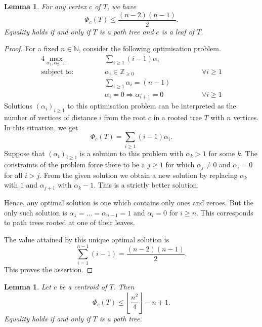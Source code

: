 \documentclass[reqno,dvipsnames]{amsart}
\theoremstyle{plain}
\newtheorem{lemma}[theorem]{Lemma}
\numberwithin{equation}{section}
\theoremstyle{definition}
\begin{document}
\begin{lemma}\label{linearphibound}
	For any vertex $c$ of $T$, we have
	\[
	\Phi_c(T) \leq \frac{(n-2)(n-1)}{2}.
	\]
	Equality holds if and only if $T$ is a path tree and $c$ is a leaf of $T$.
\end{lemma}

\begin{proof}
	For a fixed $n\in \mathbb{N}$, consider the following optimisation problem.
	\begin{alignat*}{4}
		\max_{\alpha_1,\alpha_2,\dots}	&\qquad	&&\sum_{i\geq 1} (i-1) \alpha_i  &\qquad&&\\
		\text{subject to:} 				&\qquad	&&\alpha_i\in \mathbb{Z}_{\geq 0} &\qquad&&\forall i\geq 1\\
		&\qquad	&&\sum_{i\geq 1}\alpha_i = (n-1) &\qquad&&\\
		&\qquad	&& \alpha_i = 0 \Rightarrow \alpha_{i+1} = 0 &\qquad&&\forall i\geq 1
	\end{alignat*}
	Solutions $(\alpha_i)_{i\geq 1}$ to this optimisation problem can be interpreted as the number of vertices  of distance $i$ from the root $c$ in a rooted tree $T$ with $n$ vertices. In this situation, we get
	\[
		\Phi_c(T) = \sum_{i\geq 1} (i-1) \alpha_i.
	\]
	Suppose that $(\alpha_i)_{i\geq 1}$ is a solution to this problem with $\alpha_k>1$ for some $k$. The constraints of the problem force there to be a $j\geq 1$ for which $\alpha_j \neq 0$ and $\alpha_i = 0$ for all $i>j$. From the given solution we obtain a new solution by replacing $\alpha_k$ with $1$ and $\alpha_{j+1}$ with $\alpha_k-1$. This is a strictly better solution.

	Hence, any optimal solution is one which contains only ones and zeroes. But the only such solution is $\alpha_1 = \dots = \alpha_{n-1} = 1$ and $\alpha_i = 0$ for $i\geq n$. This corresponds to path trees rooted at one of their leaves. 
	
	The value attained by this unique optimal solution is
	\[
	\sum_{i= 1}^{n-1} (i-1) = \frac{(n-2)(n-1)}{2}.
	\]
	This proves the assertion.
\end{proof}

\begin{lemma}\label{phibound}
	Let $c$ be a centroid of $T$. Then 
	\[
	\Phi_c(T) \leq \left\lfloor \frac{n^2}{4}\right\rfloor-n+1.
	\]
	Equality holds if and only if $T$ is a path tree.
\end{lemma}
\end{document}
